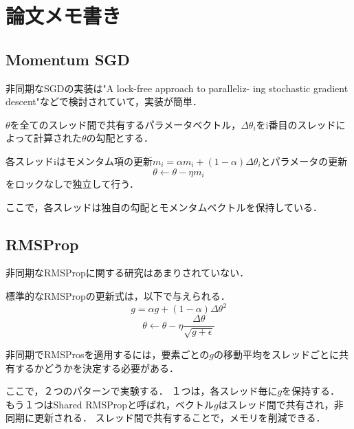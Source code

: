 \documentclass{jarticle}
\begin{document}
\section{論文メモ書き}

\subsection{Momentum SGD}
非同期なSGDの実装は"A lock-free approach to paralleliz- ing stochastic gradient descent"などで検討されていて，実装が簡単．

$\theta$を全てのスレッド間で共有するパラメータベクトル，$\Delta \theta_i$をi番目のスレッドによって計算された$\theta$の勾配とする．

各スレッドiはモメンタム項の更新$m_i=\alpha m_i+(1-\alpha)\Delta\theta_i$とパラメータの更新
$$\theta\gets\theta-\eta m_i$$
をロックなしで独立して行う．

ここで，各スレッドは独自の勾配とモメンタムベクトルを保持している．

\subsection{RMSProp}
非同期なRMSPropに関する研究はあまりされていない．

標準的なRMSPropの更新式は，以下で与えられる．
$$g=\alpha g + (1-\alpha)\Delta\theta^2$$
$$\theta \gets \theta - \eta \frac{\Delta\theta}{\sqrt{g+\epsilon}}$$

非同期でRMSProsを適用するには，要素ごとの$g$の移動平均をスレッドごとに共有するかどうかを決定する必要がある．

ここで，２つのパターンで実験する．
１つは，各スレッド毎に$g$を保持する．
もう１つはShared RMSPropと呼ばれ，ベクトル$g$はスレッド間で共有され，非同期に更新される．
スレッド間で共有することで，メモリを削減できる．
\end{document}
